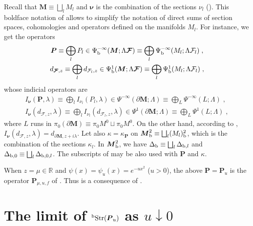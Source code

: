 \documentclass{memo-l}
\theoremstyle{plain}
\theoremstyle{definition}
\theoremstyle{remark}
\newcommand{\R}{\mathbb{R}}
\newcommand{\FF}{\mathcal{F}}
\newcommand{\bfM}{\boldsymbol{M}}
\newcommand{\bfP}{\boldsymbol{P}}
\newcommand{\bfFF}{\boldsymbol{\FF}}
\newcommand{\bfnu}{\boldsymbol{\nu}}
\newcommand{\Str}{\operatorname{Str}}
\newcommand{\bStr}{{}^{\text{\rm b}}\!\Str}
\newcommand{\Psib}{\Psi_{\text{\rm b}}}
\newcommand{\Deltab}{\Delta_{\text{\rm b}}}
\numberwithin{section}{chapter}
\numberwithin{equation}{section}%
\begin{document}
Recall that $\bfM\equiv\bigsqcup_l M_l$ and $\bfnu$ is the combination of the sections $\nu_l$ (). This boldface notation of  allows to simplify the notation of direct sums of section spaces, cohomologies and operators defined on the manifolds $M_l$. For instance, we get the operators
\begin{gather*}
\bfP\equiv\bigoplus_lP_l\in{\textstyle\Psib^{-\infty}(\bfM;\Lambda\bfFF)}
\equiv\bigoplus_l{\textstyle\Psib^{-\infty}(M_l;\Lambda\FF_l)}\;,\\
d_{\bfFF,z}\equiv\bigoplus_ld_{\FF_l,z}\in{\textstyle\Psib^1(\bfM;\Lambda\bfFF)}
\equiv\bigoplus_l{\textstyle\Psib^1(M_l;\Lambda\FF_l)}\;,
\end{gather*}
whose indicial operators are
\begin{gather*}
I_{\bfnu}(\bfP,\lambda)\equiv\bigoplus_lI_{\nu_l}(P_l,\lambda)
\in\Psi^{-\infty}(\partial\bfM;\Lambda)\equiv\bigoplus_L\Psi^{-\infty}(L;\Lambda)\;,\\
I_{\bfnu}(d_{\bfFF,z},\lambda)\equiv\bigoplus_lI_{\nu_l}(d_{\FF_l,z},\lambda)\in\Psi^1(\partial\bfM;\Lambda)\equiv\bigoplus_L\Psi^1(L;\Lambda)\;,
\end{gather*}
where $L$ runs in $\pi_0(\partial \bfM)\equiv\pi_0M^0\sqcup\pi_0M^0$. On the other hand, according to , $I_{\bfnu}(d_{\bfFF,z},\lambda)=d_{\partial \bfM,z+i\lambda}$. Let also $\kappa=\kappa_{\bfP}$ on $\bfM^2_{\text{\rm b}}\equiv\bigsqcup_l(M_l)^2_{\text{\rm b}}$, which is the combination of the sections $\kappa_l$. In $\bfM^2_{\text{\rm b}}$, we have $\Deltab\equiv\bigsqcup_l\Delta_{\text{\rm b},l}$ and $\Delta_{\text{\rm b},0}\equiv\bigsqcup_l\Delta_{\text{\rm b},0,l}$. The subscripts of  may be also used with $\bfP$ and $\kappa$.

When $z=\mu\in\R$ and $\psi(x)=\psi_u(x)=e^{-ux^2}$ ($u>0$), the above $\bfP=\bfP_u$ is the operator $\bfP_{\mu,u,f}$ of . Thus  is a consequence of .


\section{The limit of $\bStr(\bfP_u)$ as $u\downarrow0$}\label{s: lim_u to 0 bTrs(P_u z)}
\end{document}
